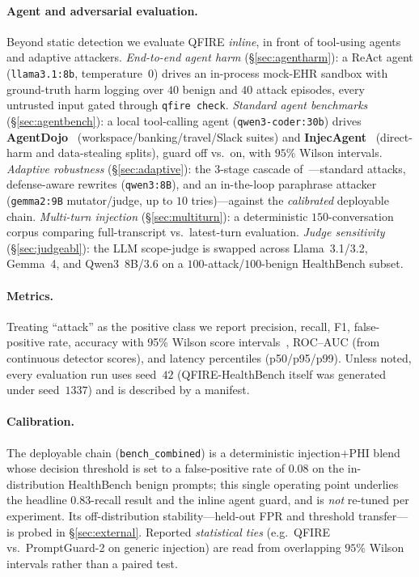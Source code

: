 \documentclass[11pt]{article}
\begin{document}
\paragraph{Agent and adversarial evaluation.} Beyond static detection we evaluate
QFIRE \emph{inline}, in front of tool-using agents and adaptive attackers.
\emph{End-to-end agent harm} (\S\ref{sec:agentharm}): a ReAct agent
(\texttt{llama3.1:8b}, temperature~$0$) drives an in-process mock-EHR
sandbox with ground-truth harm logging over $40$ benign and $40$ attack episodes,
every untrusted input gated through \texttt{qfire check}. \emph{Standard agent
benchmarks} (\S\ref{sec:agentbench}): a local tool-calling agent
(\texttt{qwen3-coder:30b}) drives \textbf{AgentDojo}~\cite{agentdojo2024}
(workspace/banking/travel/Slack suites) and \textbf{InjecAgent}~\cite{injecagent2024}
(direct-harm and data-stealing splits), guard off vs.\ on, with $95\%$ Wilson
intervals. \emph{Adaptive robustness} (\S\ref{sec:adaptive}): the 3-stage cascade
of~\cite{firewallsbench2026}---standard attacks, defense-aware rewrites
(\texttt{qwen3:8B}), and an in-the-loop paraphrase attacker (\texttt{gemma2:9B}
mutator/judge, up to $10$ tries)---against the \emph{calibrated} deployable chain.
\emph{Multi-turn injection} (\S\ref{sec:multiturn}): a deterministic
$150$-conversation corpus comparing full-transcript vs.\ latest-turn evaluation.
\emph{Judge sensitivity} (\S\ref{sec:judgeabl}): the LLM scope-judge is swapped across
Llama~3.1/3.2, Gemma~4, and Qwen3~8B/3.6 on a $100$-attack/$100$-benign HealthBench subset.

\paragraph{Metrics.} Treating ``attack'' as the positive class we report
precision, recall, F1, false-positive rate, accuracy with 95\% Wilson score
intervals~\cite{wilson1927}, ROC--AUC (from continuous detector scores), and
latency percentiles (p50/p95/p99). Unless noted, every evaluation run uses
seed~$42$ (QFIRE-HealthBench itself was generated under seed~$1337$) and is
described by a manifest.

\paragraph{Calibration.} The deployable chain (\texttt{bench\_combined}) is a
deterministic injection$+$PHI blend whose decision threshold is set to a
false-positive rate of $0.08$ on the in-distribution HealthBench benign prompts;
this single operating point underlies the headline $0.83$-recall result and the
inline agent guard, and is \emph{not} re-tuned per experiment. Its off-distribution
stability---held-out FPR and threshold transfer---is probed in \S\ref{sec:external}.
Reported \emph{statistical ties} (e.g.\ QFIRE vs.\ PromptGuard-2 on generic injection)
are read from overlapping $95\%$ Wilson intervals rather than a paired test.
\end{document}
